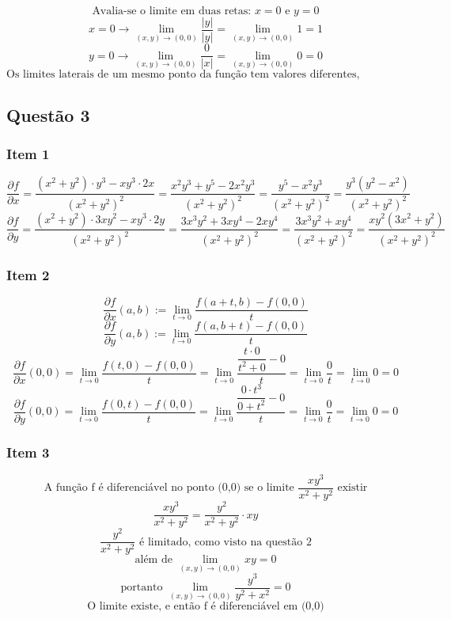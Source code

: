\documentclass[12pt]{article}
\begin{document}
\[\text{Avalia-se o limite em duas retas: } x = 0 \text{ e } y = 0\]
\[x = 0 \longrightarrow \lim_{(x,y) \rightarrow (0,0)} \dfrac{|y|}{|y|} = \lim_{(x,y) \rightarrow (0,0)} 1 = 1\]
\[y = 0 \longrightarrow \lim_{(x,y) \rightarrow (0,0)} \dfrac{0}{|x|} = \lim_{(x,y) \rightarrow (0,0)} 0 = 0\]
\[\text{Os limites laterais de um mesmo ponto da função tem valores diferentes, portanto o limite não existe}\]

\subsection{Questão 3}
\subsubsection{Item 1}

\[\dfrac{\partial f}{\partial x} = \dfrac{(x^{2}+y^{2}) \cdot y^{3} - xy^{3} \cdot 2x}{(x^{2}+y^{2})^{2}} = \dfrac{x^{2}y^{3} + y^{5} - 2x^{2}y^{3}}{(x^{2}+y^{2})^{2}} = \dfrac{y^{5} - x^{2}y^{3}}{(x^{2}+y^{2})^{2}} = \dfrac{y^{3}(y^{2}-x^{2})}{(x^{2}+y^{2})^{2}}\]
\[\dfrac{\partial f}{\partial y} = \dfrac{(x^{2}+y^{2}) \cdot 3xy^{2} - xy^{3} \cdot 2y}{(x^{2}+y^{2})^{2}} = \dfrac{3x^{3}y^{2} + 3xy^{4} - 2xy^{4}}{(x^{2}+y^{2})^{2}} = \dfrac{3x^{3}y^{2} + xy^{4}}{(x^{2}+y^{2})^{2}} = \dfrac{xy^{2} (3x^{2}+y^{2})}{(x^{2}+y^{2})^{2}}\]

\subsubsection{Item 2}

\[\dfrac{\partial f}{\partial x}(a,b) := \lim_{t \rightarrow 0} \dfrac{f(a+t,b)-f(0,0)}{t}\]
\[\dfrac{\partial f}{\partial y}(a,b) := \lim_{t \rightarrow 0} \dfrac{f(a,b+t)-f(0,0)}{t}\]
\[\dfrac{\partial f}{\partial x}(0,0) = \lim_{t \rightarrow 0} \dfrac{f(t,0)-f(0,0)}{t} = \lim_{t \rightarrow 0} \dfrac{\dfrac{t \cdot 0}{t^{2}+0}-0}{t} = \lim_{t \rightarrow 0} \dfrac{0}{t} = \lim_{t \rightarrow 0} 0 = 0\]
\[\dfrac{\partial f}{\partial y}(0,0) = \lim_{t \rightarrow 0} \dfrac{f(0,t)-f(0,0)}{t} = \lim_{t \rightarrow 0} \dfrac{\dfrac{0 \cdot t^{3}}{0+t^{2}}-0}{t} = \lim_{t \rightarrow 0} \dfrac{0}{t} = \lim_{t \rightarrow 0} 0 = 0\]

\subsubsection{Item 3}

\[\text{A função f é diferenciável no ponto (0,0) se o limite } \dfrac{xy^{3}}{x^{2}+y^{2}} \text{ existir}\]
\[\dfrac{xy^{3}}{x^{2}+y^{2}} = \dfrac{y^{2}}{x^{2}+y^{2}} \cdot xy\]
\[\dfrac{y^{2}}{x^{2}+y^{2}} \text{ é limitado, como visto na questão 2}\]
\[\text{além de } \lim_{(x,y) \rightarrow (0,0)} xy = 0\]
\[\text{portanto } \lim_{(x,y) \rightarrow (0,0)} \dfrac{y^{3}}{y^{2}+x^{2}} = 0\]
\[\text{O limite existe, e então f é diferenciável em (0,0)}\]
\end{document}

